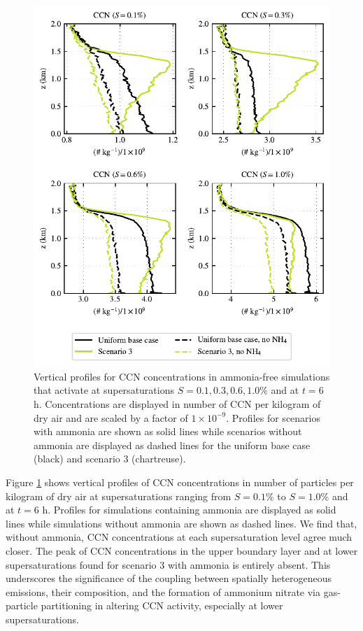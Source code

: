 \documentclass[journal abbreviation, manuscript]{copernicus}
\begin{document}
\begin{figure}[!h]
	\centering
	\includegraphics[]{figures/aerosol-ccn-vertical-profiles-no-nh4-cases-time36.pdf}
	\caption{Vertical profiles for CCN concentrations in ammonia-free simulations that activate at supersaturations $S=0.1, 0.3, 0.6, 1.0\%$ and at $t=6$ h. Concentrations are displayed in number of CCN per kilogram of dry air and are scaled by a factor of $1\times10^{-9}$. Profiles for scenarios with ammonia are shown as solid lines while scenarios without ammonia are displayed as dashed lines for the uniform base case (black) and scenario 3 (chartreuse).}
	\label{fig:ccn-vertical-profile-no-ammonia}
\end{figure}

Figure \ref{fig:ccn-vertical-profile-no-ammonia} shows vertical profiles of CCN concentrations in number of particles per kilogram of dry air at supersaturations ranging from $S=0.1\%$ to $S=1.0\%$ and at $t=6$ h. Profiles for simulations containing ammonia are displayed as solid lines while simulations without ammonia are shown as dashed lines. We find that, without ammonia, CCN concentrations at each supersaturation level agree much closer. The peak of CCN concentrations in the upper boundary layer and at lower supersaturations found for scenario 3 with ammonia is entirely absent. This underscores the significance of the coupling between spatially heterogeneous emissions, their composition, and the formation of ammonium nitrate via gas-particle partitioning in altering CCN activity, especially at lower supersaturations. 
\end{document}
